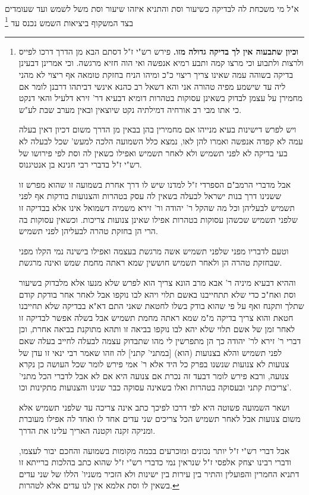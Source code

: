 \documentclass[12pt, openany]{book}
\newcommand{\footnotecomment}[1]{\footnote{#1}}
\newcommand{\commenta}[1]{\footnotecomment{#1}}
\begin{document}
{א"ל  מי משכחת לה לבדיקה כשיעור וסת  והתניא  איזהו שיעור וסת משל לשמש ועד שעומדים בצד המשקוף ביציאות השמש נכנס עד
\commenta{\textbf{וכיון שתבעוה אין לך בדיקה גדולה מזו.}  פירש רש"י ז"ל דסתם הבא מן הדרך דרכו לפייס ולרצות ולתבוע וכי מרצו קמה ותבע רמיא אנפשה ואי הוה חזיא מרגשה. וכי אמרינן דבעינן בדיקה בשוהה עמה שאינו צריך ריצוי כ"כ ומיהו הניח בחזקת טומאה אף ריצוי לא מהני ליה עד שישמע מפיה טהורה אני והא דשאל רב כהנא אינשי דביתהו דרבנן לומר אם מחמירן על עצמן לבדוק בשאינן עסוקות בטהרות דומיא דבעיא דר' זירא דלעיל והאי דנקט כי אתו מבי רב אורחיה דמילתיה נקט שיוצאין ובאין מערב שבת לע"ש.\par  ויש לפרש דישינות בעיא מנייהו אם מחמירין בהן בבאין מן הדרך משום דכיון דאין בעלה עמה לא קפדה אנפשה ואמרו להן לאו, נמצא כלל השמועה הלכה למעש' שכל לבעלה לא בעי בדיקה לא לפני תשמיש ולא לאחר תשמיש ואפילו כשאין לה וסת לפי פירושו של רש"י ז"ל בדברי רבי חנינא בן אנטיגנוס.\par  אבל מדברי הרמב"ם הספרדי ז"ל למדנו שיש לו דרך אחרת בשמועה זו שהוא מפרש זו ששנינו דרך בנות ישראל לבעלה בשאין לה עסק בטהרות והצנועות בודקות אף לפני תשמיש לבעליהן וכל מה שהקל ר' יהודה ור' זירא משמיה דשמואל אינו אלא בבדיקה זו שלפני תשמיש שכשהן עסוקות בטהרות אפילו שאינן צנועות צריכות. וכשאין עסוקות בה הרי הן בחזקת טהרה לבעליהן לפני תשמיש.\par  וטעם לדבריו מפני שלפני תשמיש אשה מרגשת בעצמה ואפילו בישינה נמי הקלו מפני שבחזקת טהרה הן ולאחר תשמיש חוששין שמא ראתה מחמת שמש ואינה מרגשת.\par וההיא דבעיא מיניה ר' אבא מרב הונא צריך הוא לפרש שלא מנעו אלא מלבדוק בשיעור וסת ואח"כ כדי שלא תתחייבנו באשם תלוי ויהא לבו נוקפו אבל לאחר אחר בודקת קודם שתלך ותקנח ואף על פי שהוא בודק בשלו לחטאת שאני התם דא"א בבדיקה שלא תחייבנו חטאת והוא צריך בדיקה מ"מ שמא ראתה מחמת תשמיש אבל בשלה אפשר לבדיקה זו לאחר זמן של אשם תלוי שלא יהא לבו נוקפו בביאה זו ותהא מתוקנת בביאה אחרת, וכן דברי ר' זירא לר' יהודה כך הן מתפרשין לי מהו שתבדוק עצמה לבעלה לחייב בעלה שאם לפני תשמיש והלא בצנועות (הוא) [במתני' קתני] לה וזהו שאמר רבי ינאי זו עדן של צנועות לא צנועות שנשנו בפרק כל היד אלא ר' אמי פירש לומר שכל העושה כן נקרא צנועה, ורבא פירש לומר דבעד זה נכרת אם צנועה היא אם לא אבל לדברי הכל מתני' צריכות קתני ובעסוקה בטהרות ואלו בשאינה עסוקה כבר שנינו והצנועות מתקינות וכו'.\par ושאר השמועה פשוטה היא לפי דרכו לפיכך כתב אינה צריכה עד שלפני תשמיש אלא משום צנועות אבל לאחר תשמיש הכל צריכים שני עדים אחד לו ואחד לה אפילו מעוברת ומניקה זקנה וקטנה האריך עלינו את הדרך.\par  אבל דברי רש"י ז"ל יותר נכונים ומוכרעים בכמה מקומות בשמועה והחכם יבור לעצמו, ודברי רבינו יצחק אלפסי ז"ל שנראין נמי כדברי רש"י ז"ל שהוא כתב בהלכות ברייתא זו דתניא החמרין והפועלין והתיר בין עירות בין ישינות ולא הזכיר משניו' הללו של שני עדים בשאין לו וסת אלמא אין לנו עדים אלא לטהרות. }

}
\end{document}
